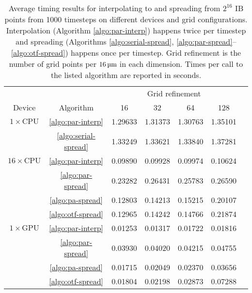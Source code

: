 \begin{table*}[ht]
    \begin{center}
    \bgroup
    \renewcommand{\arraystretch}{1.7}
    \begin{tabular}{ccccccc}
                                                                                              \toprule
                             &                          & \multicolumn{4}{c}{Grid refinement}   \\ \cline{3-6}
        Device               & Algorithm                & 16      & 32      & 64      & 128     \\ \midrule
        $1\times\text{CPU}$  & \ref{algo:par-interp}    & 1.29633 & 1.31373 & 1.30763 & 1.35101 \\
                             & \ref{algo:serial-spread} & 1.33249 & 1.33621 & 1.33840 & 1.37281 \\ \midrule
        $16\times\text{CPU}$ & \ref{algo:par-interp}    & 0.09890 & 0.09928 & 0.09974 & 0.10624 \\
                             & \ref{algo:par-spread}    & 0.23282 & 0.26431 & 0.25783 & 0.26590 \\
                             & \ref{algo:pa-spread}     & 0.12803 & 0.14213 & 0.15215 & 0.20107 \\
                             & \ref{algo:otf-spread}    & 0.12965 & 0.14242 & 0.14766 & 0.21874 \\ \midrule
        $1\times\text{GPU}$  & \ref{algo:par-interp}    & 0.01253 & 0.01317 & 0.01722 & 0.01816 \\
                             & \ref{algo:par-spread}    & 0.03930 & 0.04020 & 0.04215 & 0.04755 \\
                             & \ref{algo:pa-spread}     & 0.01715 & 0.02049 & 0.02370 & 0.03656 \\
                             & \ref{algo:otf-spread}    & 0.01804 & 0.02198 & 0.02873 & 0.07288 \\ \bottomrule
    \end{tabular}
    \egroup
    \end{center}
    \caption{%
Average timing results for interpolating to and spreading from $2^{16}$ IB points from
1000 timesteps on different devices and grid configurations. Interpolation (Algorithm
\ref{algo:par-interp}) happens twice per timestep and spreading (Algorithms
\ref{algo:serial-spread}, \ref{algo:par-spread}--\ref{algo:otf-spread}) happens once per
timestep. Grid refinement is the number of grid points per $16\um$ in each dimension.
Times per call to the listed algorithm are reported in seconds.
    }
    \label{tab:grid-timing}
\end{table*}

